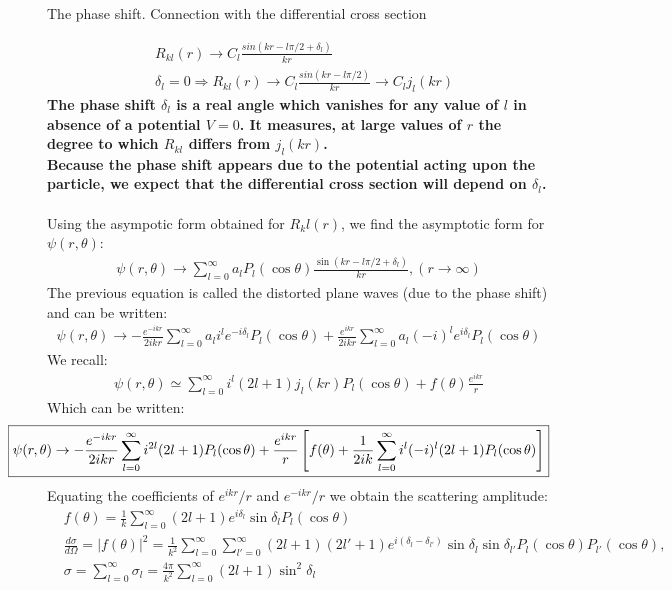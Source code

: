 \begin{frame}[allowframebreaks]{The phase shift. Connection with the differential cross section}

\begin{align}
&R_{kl}(r)\to C_l\frac{sin(kr-l\pi/2+\delta_l)}{kr}\\
&\delta_l=0 \Rightarrow  R_{kl}(r)\to C_l\frac{sin(kr-l\pi/2)}{kr} \to C_l j_l(kr)
\end{align}
{\bf The phase shift $\delta_l$ is a real angle which vanishes for any value of $l$ in absence of a potential $V=0$. It measures, at large values of $r$ the degree to which $R_{kl}$ differs from $j_l(kr)$.\\
Because the phase shift appears due to the potential acting upon the particle, we expect that the differential cross section will depend on $\delta_l$.} 
\\~\\
Using the asympotic form obtained for $R_kl(r)$, we find the asymptotic form for $\psi(r,\theta)$:
\begin{align}
\psi(r,\theta)\to\sum_{l=0}^{\infty}a_lP_l(\cos\theta)\frac{\sin(kr-l\pi/2+\delta_l)}{kr},(r\to\infty)
\end{align}
The previous equation is called the distorted plane waves (due to the phase shift) and can be written:
\begin{align}
\boxed{\psi(r,\theta)\to -\frac{e^{-ikr}}{2ikr}\sum_{l=0}^{\infty}a_li^le^{-i\delta_l}P_l(\cos\theta)+\frac{e^{ikr}}{2ikr}\sum_{l=0}^{\infty}a_l(-i)^le^{i\delta_l}P_l(\cos\theta)} \label{ecuatie276}
\end{align}
We recall:
\begin{align}
\psi(r,\theta)\simeq\sum_{l=0}^{\infty}i^l(2l+1)j_l(kr)P_l(\cos\theta)+f(\theta)\frac{e^{ikr}}{r}
\end{align}
Which can be written:
\begin{align}
\hspace*{-1cm}\boxed{\psi(r,\theta)\to-\frac{e^{-ikr}}{2ikr}\sum_{l=0}^{\infty}i^{2l}(2l+1)P_l(\cos\theta)+\frac{e^{ikr}}{r}\left[f(\theta)+\frac{1}{2ik}\sum_{l=0}^{\infty}i^l(-i)^l(2l+1)P_l(\cos\theta)\right]} \label{ecuatie268}
\end{align}
Equating the coefficients of $e^{ikr}/r$ and $e^{-ikr}/r$ we obtain the scattering amplitude:
\begin{align}
&f(\theta)=\frac{1}{k}\sum_{l=0}^{\infty}(2l+1)e^{i\delta_l}\sin\delta_lP_l(\cos\theta)\\
&\frac{d\sigma}{d\Omega}=|f(\theta)|^2=\frac{1}{k^2}\sum_{l=0}^{\infty}\sum_{l'=0}^{\infty}(2l+1)
(2l'+1)e^{i(\delta_l-\delta_{l'})}\sin\delta_l\sin\delta_{l'}P_l(\cos\theta)P_{l'}(\cos\theta),\\
&\boxed{\sigma=\sum_{l=0}^{\infty}\sigma_l=\frac{4\pi}{k^2}\sum_{l=0}^{\infty}(2l+1)\sin^2\delta_l}
\end{align}

\end{frame} 

